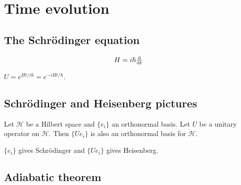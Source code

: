 \section{Time evolution}
\subsection{The Schrödinger equation}
\[ H = i\hbar\od{}{t} \]

\begin{lemma}
$U = e^{Ht / i\hbar} = e^{-iHt/\hbar}$.
\end{lemma}


\subsection{Schrödinger and Heisenberg pictures}
\begin{lemma}
Let $\mathcal{H}$ be a Hilbert space and $\{e_i\}$ an orthonormal basis. Let $U$ be a unitary operator on $\mathcal{H}$. Then $\{Ue_i\}$ is also an orthonormal basis for $\mathcal{H}$.
\end{lemma}
$\{e_i\}$ gives Schrödinger and $\{Ue_i\}$ gives Heisenberg.



\subsection{Adiabatic theorem}

